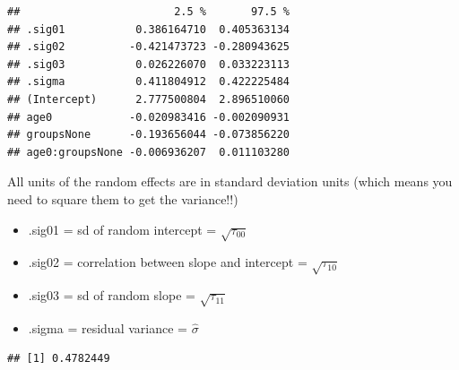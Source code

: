 \begin{frame}[fragile]

\footnotesize

\begin{Shaded}
\begin{Highlighting}[]
 \NormalTok{, } \NormalTok{)}
\end{Highlighting}
\end{Shaded}

\begin{verbatim}
##                        2.5 %       97.5 %
## .sig01           0.386164710  0.405363134
## .sig02          -0.421473723 -0.280943625
## .sig03           0.026226070  0.033223113
## .sigma           0.411804912  0.422225484
## (Intercept)      2.777500804  2.896510060
## age0            -0.020983416 -0.002090931
## groupsNone      -0.193656044 -0.073856220
## age0:groupsNone -0.006936207  0.011103280
\end{verbatim}

All units of the random effects are in standard deviation units (which
means you need to square them to get the variance!!)\\

\begin{itemize}
  \item .sig01 = sd of random intercept = $\sqrt{\tau_{00}}$  
  \item .sig02 = correlation between slope and intercept = $\sqrt{\tau_{10}}$  
  \item .sig03 = sd of random slope = $\sqrt{\tau_{11}}$  
  \item .sigma = residual variance = $\hat{\sigma}$  
\end{itemize}

\end{frame}

\begin{frame}[fragile]

\small

\begin{Shaded}
\begin{Highlighting}[]
\OperatorTok{::}
\end{Highlighting}
\end{Shaded}

\begin{verbatim}
## [1] 0.4782449
\end{verbatim}

\end{frame}


